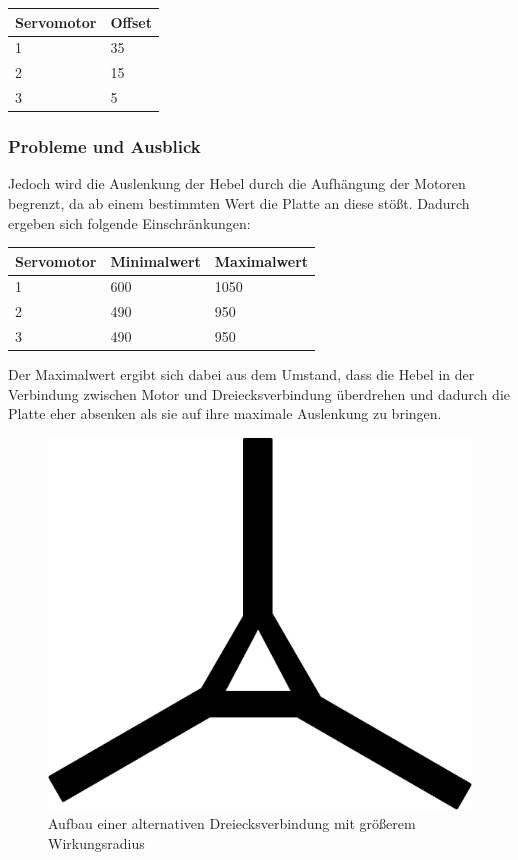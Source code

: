\documentclass[12pt,a4paper,bibliography=totoc,listof=totoc]{scrartcl}
\begin{document}
\begin{tabularx}{4cm}{|l|l|}
\hline
 Servomotor		& Offset \\
\hline
 1				& 35	\\
\hline
 2				& 15\\
\hline
 3				& 5	\\
\hline
\end{tabularx}
\newline
\subsubsection{Probleme und Ausblick}

Jedoch wird die Auslenkung der Hebel durch die Aufhängung der Motoren begrenzt, da ab einem 
bestimmten Wert die Platte an diese stößt. Dadurch ergeben sich folgende Einschränkungen:
\newline
\begin{tabularx}{8cm}{|l|l|l|}
\hline
 Servomotor		& Minimalwert & Maximalwert \\
\hline
 1				& 600		&  1050 \\
\hline
 2				& 490		& 950\\
\hline
 3				& 490		& 950\\
\hline
\end{tabularx}
\newline
Der Maximalwert ergibt sich dabei aus dem Umstand, dass die Hebel in der Verbindung zwischen Motor und 
Dreiecksverbindung überdrehen und dadurch die Platte eher absenken als sie auf ihre maximale Auslenkung zu 
bringen. 
 \begin{figure}[htbp]
	\centering
	\includegraphics[scale = 0.8]{pics/neuedreiecksverbindung}
	\caption{Aufbau einer alternativen Dreiecksverbindung mit größerem Wirkungsradius}
	\label{fig:dreieckneu}
\end{figure}
\end{document}
